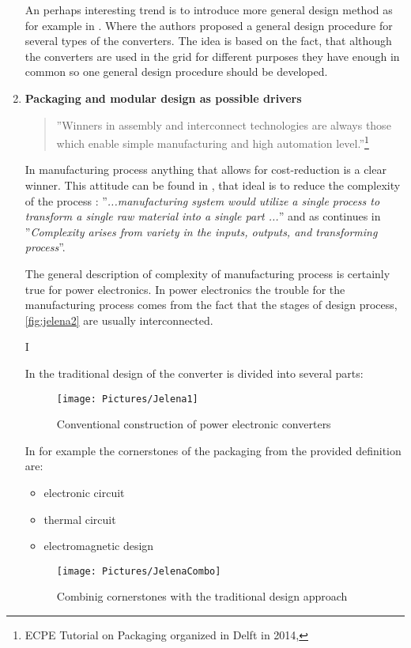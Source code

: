 \documentclass[]{scrartcl}
\begin{document}
\begin{enumerate}
	An perhaps interesting trend is to introduce more general design method as for example in \cite{Ortjohann2009}. Where the authors proposed a general design procedure for several types of the converters. The idea is based on the fact, that although the converters are used in the grid for different purposes they have enough in common so one general design procedure should be developed. 
	
	\item 	\textbf{Packaging and modular design as possible drivers}
	
	 \begin{quote}
		''Winners in assembly and interconnect technologies are always those which enable simple manufacturing and high automation level.''\footnote{ ECPE Tutorial on Packaging organized in Delft in 2014,\cite{Bayerer}}
	\end{quote}
	
In manufacturing process anything that allows for cost-reduction is a clear winner. This attitude can be found in \cite{Ulrich2004}, that ideal is to reduce the complexity of the process  : ''\emph{...manufacturing system would utilize a single process to transform a single raw material into a single part ...}'' and as continues in \cite{Ulrich2004} ''\emph{Complexity arises from variety in the inputs, outputs, and transforming process}''.

The general description of complexity of manufacturing process is certainly true for power electronics. In power electronics the trouble for the manufacturing process comes from the fact that the stages of design process, \ref{fig:jelena2} are usually interconnected. 
	
	I
	
	In \cite{Popovic2005} the traditional design of the converter is divided into several parts:
	\begin{figure}[h!]
		\centering
		\texttt{[image: Pictures/Jelena1]}
		\caption{Conventional construction of power electronic converters}
		\label{fig:jelena1}
	\end{figure}
	\newpage
	In for example \cite{Abraham2005} the cornerstones of the packaging from the provided definition are: 
	\begin{itemize}
		\item electronic circuit
		\item thermal circuit
		\item electromagnetic design
	\end{itemize}
	\begin{figure}[h!]
		\centering
		\texttt{[image: Pictures/JelenaCombo]}
		\caption{Combinig cornerstones with the traditional design approach}
		\label{fig:jelenacombo}
	\end{figure}
	
	
	\end{enumerate}
	
\end{document}
